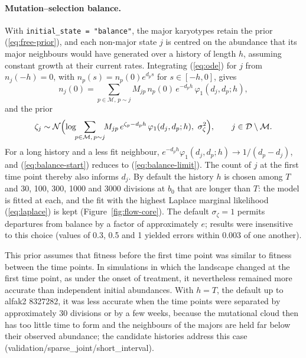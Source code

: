\documentclass[11pt]{article}
\newcommand{\Normal}{\mathcal{N}}
\begin{document}
\paragraph{Mutation--selection balance.}
With \texttt{initial\_state = "balance"}, the major karyotypes retain the
prior (\ref{eq:free-prior}), and each non-major state $j$ is centred on the
abundance that its major neighbours would have generated over a history of
length $h$, assuming constant growth at their current rates. Integrating
(\ref{eq:ode}) for $j$ from $n_j(-h)=0$, with $n_p(s)=n_p(0)e^{d_ps}$ for
$s\in[-h,0]$, gives
\begin{equation}
  n_j(0)=\sum_{p\in\mathcal{M},\,p\sim j}M_{jp}\,n_p(0)\,e^{-d_ph}\,\varphi_1(d_j,d_p;h),
  \label{eq:balance-start}
\end{equation}
and the prior
\begin{equation}
  \zeta_j\sim\Normal\Bigl(\log\!\!\sum_{p\in\mathcal{M},\,p\sim j}\!\!M_{jp}\,
  e^{\zeta_p-d_ph}\,\varphi_1(d_j,d_p;h),\ \sigma_\zeta^2\Bigr),
  \qquad j\in\mathcal{D}\setminus\mathcal{M}.
  \label{eq:balance-prior}
\end{equation}
For a long history and a less fit neighbour,
$e^{-d_ph}\varphi_1(d_j,d_p;h)\to1/(d_p-d_j)$, and (\ref{eq:balance-start})
reduces to (\ref{eq:balance-limit}). The count of $j$ at the first time point
thereby also informs $d_j$. By default the history $h$ is chosen among $T$ and
30, 100, 300, 1000 and 3000 divisions at $b_0$ that are longer than $T$: the
model is fitted at each, and the fit with the highest Laplace marginal
likelihood (\ref{eq:laplace}) is kept (Figure~\ref{fig:flow-core}). The
default $\sigma_\zeta=1$ permits departures from balance by a factor of
approximately $e$; results were insensitive to this choice (values of 0.3, 0.5
and 1 yielded errors within 0.003 of one another).

This prior assumes that fitness before the first time point was similar to
fitness between the time points. In simulations in which the landscape changed at
the first time point, as under the onset of treatment, it nevertheless remained
more accurate than independent initial abundances. With $h=T$, the default up
to alfak2 8327282, it was less accurate when the time points were separated by
approximately 30 divisions or by a few weeks, because the mutational cloud
then has too little time to form and the neighbours of the majors are held far
below their observed abundance; the candidate histories address this case
(validation/sparse\_joint/short\_interval).
\end{document}

